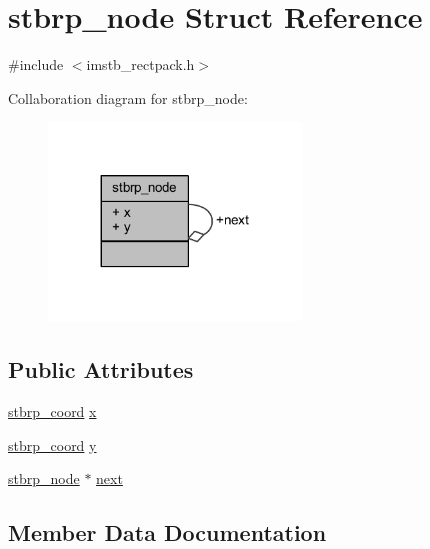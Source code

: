 \hypertarget{structstbrp__node}{}\section{stbrp\+\_\+node Struct Reference}
\label{structstbrp__node}


{\ttfamily \#include $<$imstb\+\_\+rectpack.\+h$>$}



Collaboration diagram for stbrp\+\_\+node\+:
\nopagebreak
\begin{figure}[H]
\begin{center}
\leavevmode
\includegraphics[width=191pt]{structstbrp__node__coll__graph}
\end{center}
\end{figure}
\subsection*{Public Attributes}
\begin{DoxyCompactItemize}
\item 
\mbox{\hyperlink{imstb__rectpack_8h_ac2c2491b95dea6a298b7423dc762dfd9}{stbrp\+\_\+coord}} \mbox{\hyperlink{structstbrp__node_a45ab31a88025db27d08040d715b129ea}{x}}
\item 
\mbox{\hyperlink{imstb__rectpack_8h_ac2c2491b95dea6a298b7423dc762dfd9}{stbrp\+\_\+coord}} \mbox{\hyperlink{structstbrp__node_ad0415cb102a4f37aa45073653307e67e}{y}}
\item 
\mbox{\hyperlink{structstbrp__node}{stbrp\+\_\+node}} $\ast$ \mbox{\hyperlink{structstbrp__node_a933cb2dd6cddc4fcaf10e3b40634bed4}{next}}
\end{DoxyCompactItemize}


\subsection{Member Data Documentation}
\mbox{\label{structstbrp__node_a933cb2dd6cddc4fcaf10e3b40634bed4}} 

